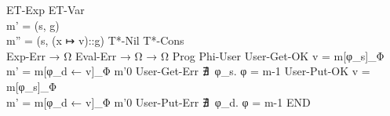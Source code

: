 {{    }
    {ET-Exp}{ 
                {}
                {}
            }
    {ET-Var}{ 
                {
               \\ m'  = (s, g)
               \\ m'' = (s, (x ↦ v)::g)
                }
                {}
    }
    {T*-Nil}{ 
                 { }
                 {}
    }
    {T*-Cons}{ 
                  { \\
                   }
                  {}
    }
    {Exp-Err}{ 
                 { }
                 {  → Ω }
    }
    {Eval-Err}{ 
                  {  → Ω }
                  {  → Ω }
    }
    {Prog}{ 
              {}
              {}
    }
    {Phi-User}{ 
                      { }
                      {  }
    }
    {User-Get-OK}{ 
                     { v  = m[φ_s]_Φ
                    \\ m' = m[φ_d ← v]_Φ
                     }
                     { 
                       {m'}{0}
                     }
    }
    {User-Get-Err}{ 
                      {
                        ∄~φ_s. φ = 
                      }
                      { 
                           {m}{-1}
                      }
    }
    {User-Put-OK}{ 
                     { v = m[φ_s]_Φ
                    \\ m' = m[φ_d ← v]_Φ
                     }
                     { 
                         {m'}{0}
                     }
    }
    {User-Put-Err}{ 
                      {
                        ∄~φ_d. φ = 
                      }
                      { 
                           {m}{-1}
                      }
    }
    {END}
}

\def\figctx{
  \begin{align*}
  \gramdef{Contextes}{C}
    { \ctxEmpty }{}
    { \ctxOp{C}{e} }{}
    { \ctxOp{v}{C} }{}
    { \ctxUnOp{C} }{}
    { \&~C }{}
    { \ctxSet{C}{e} }{}
    { \ctxSet{φ}{C} }{}
    { \eStruct{ l_1:v_1 ; … ; l_i:C ; … ; l_n:e_n } }{}
    { \eArray{ v_1 ; … ; C ; … ; e_n } }{}
    { C (e_1, …, e_n) }{}
    { f (v_1, …, C, …, e_n) }{}
    { \ctxLvField{C}{l_S} }{}
    { \ctxLvIndex{C}{e} }{}
    { \ctxLvIndex{φ}{C} }{}
    { *~C }{}
    { C;i }{}
    { \iIf{C}{i_1}{i_2} }{}
    { \iReturn{C} }{}
    { \iDecl{x}{C}{i} }{}
    {END}
  \end{align*}
}

